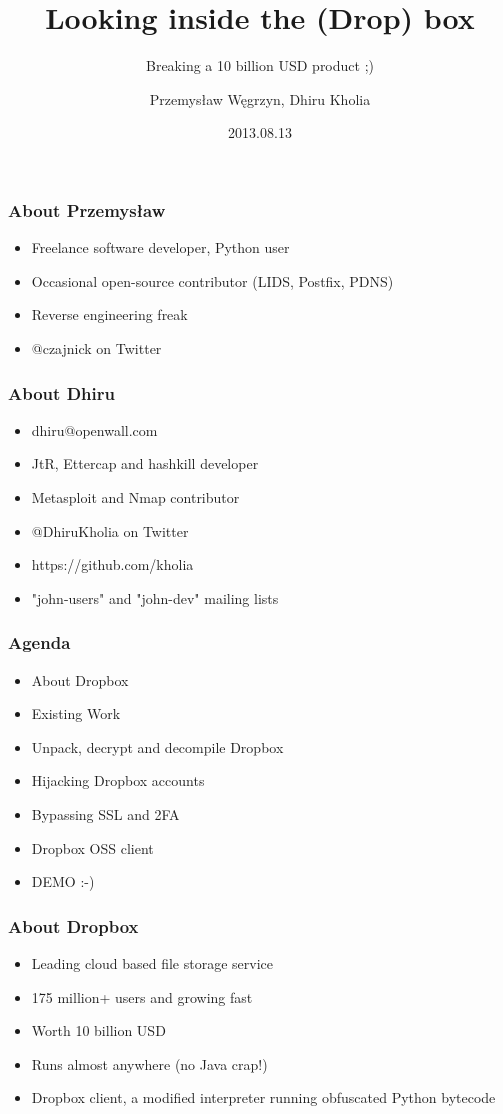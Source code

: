 \documentclass{beamer}
\title{Looking inside the (Drop) box}
\subtitle{Breaking a 10 billion USD product ;)}
\author{Przemysław Węgrzyn, Dhiru Kholia}
\date{2013.08.13}
\newcommand\myfont{\fontsize{14}{20}\selectfont}
\begin{document}
\frame{\titlepage}

\begin{frame}
\frametitle{About Przemysław}
\myfont
\begin{itemize}
\itemsep 2em
\item Freelance software developer, Python user
\item Occasional open-source contributor (LIDS, Postfix, PDNS)
\item Reverse engineering freak
\item @czajnick on Twitter
\end{itemize}
\end{frame}

\begin{frame}
\frametitle{About Dhiru}
\myfont
\begin{itemize}
\itemsep 1.2em
\item dhiru@openwall.com
\item JtR, Ettercap and hashkill developer
\item Metasploit and Nmap contributor
\item @DhiruKholia on Twitter
\item https://github.com/kholia
\item "john-users" and "john-dev" mailing lists
\end{itemize}
\end{frame}

\begin{frame}
\frametitle{Agenda}
\begin{itemize}
\itemsep 1.7em
\item About Dropbox
\item Existing Work
\item Unpack, decrypt and decompile Dropbox
\item Hijacking Dropbox accounts
\item Bypassing SSL and 2FA
\item Dropbox OSS client
\item DEMO :-)
\end{itemize}
\end{frame}

\begin{frame}
\frametitle{About Dropbox}
\myfont
\begin{itemize}
\itemsep 1.2em
\item Leading cloud based file storage service

\item 175 million+ users and growing fast

\item Worth 10 billion USD

\item Runs almost anywhere (no Java crap!)

\item Dropbox client, a modified interpreter running obfuscated Python bytecode
\end{itemize}
\end{frame}
\end{document}
